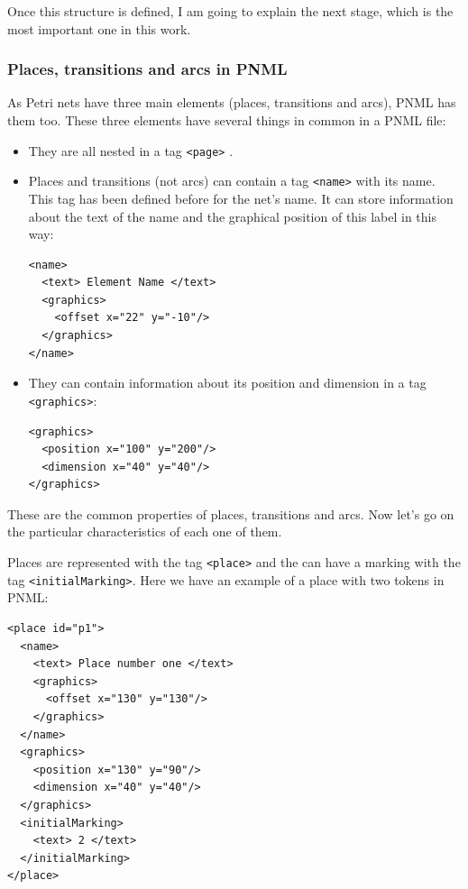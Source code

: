 Once this structure is defined, I am going to explain the next stage, which
is the most important one in this work. 

\subsubsection{Places, transitions and arcs in PNML}

As Petri nets have three main elements (places, transitions
and arcs), PNML has them too. These three elements have several things in common in a PNML file:
\begin{itemize}
  \item They are all nested in a tag \texttt{<page>} .


  \item Places and transitions (not arcs) can contain a tag \texttt{<name>} with its name. This tag has been defined before for the net's name. It
can store information about the text of the name and the graphical position
of this label in this way:
\begin{lstlisting}
<name>
  <text> Element Name </text>
  <graphics>
    <offset x="22" y="-10"/>
  </graphics>
</name>
\end{lstlisting}
   \item They can contain information about its position and dimension in
a tag \texttt{<graphics>}:
\begin{lstlisting}
<graphics>
  <position x="100" y="200"/>
  <dimension x="40" y="40"/>
</graphics>
\end{lstlisting}
\end{itemize}


These are the common properties of places, transitions and arcs. Now let's
go on the particular characteristics of each one of them.

Places are represented with the tag \texttt{<place>} and the can have a marking with the tag \texttt{<initialMarking>}.
Here we have an example of a place with two tokens in PNML: 

\begin{lstlisting}[label=pmnl_place,caption=PNML representation
for places]
<place id="p1">
  <name>
    <text> Place number one </text>
    <graphics>
      <offset x="130" y="130"/>
    </graphics>
  </name>
  <graphics>
    <position x="130" y="90"/>
    <dimension x="40" y="40"/>
  </graphics>
  <initialMarking>
    <text> 2 </text>
  </initialMarking>
</place>
\end{lstlisting}

